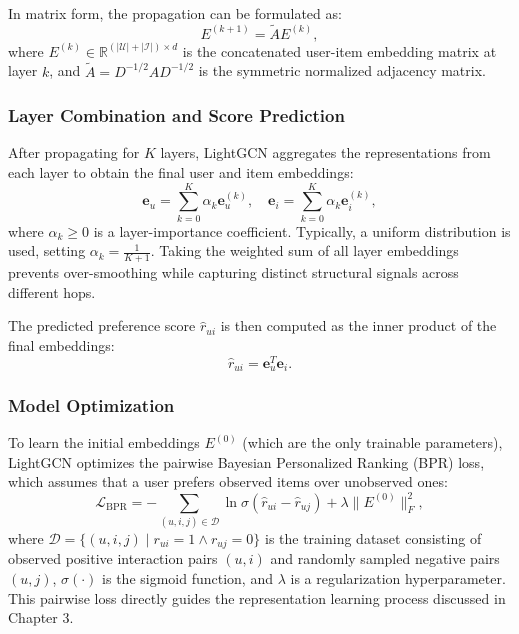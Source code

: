 In matrix form, the propagation can be formulated as:
\begin{equation}
    E^{(k+1)} = \tilde{A} E^{(k)},
    \label{eq:matrix_propagation}
\end{equation}
where \(E^{(k)} \in \mathbb{R}^{(|\mathcal{U}| + |\mathcal{I}|) \times d}\) is the concatenated user-item embedding matrix at layer \(k\), and \(\tilde{A} = D^{-1/2} A D^{-1/2}\) is the symmetric normalized adjacency matrix.

\subsubsection{Layer Combination and Score Prediction}

After propagating for \(K\) layers, LightGCN aggregates the representations from each layer to obtain the final user and item embeddings:
\begin{equation}
    \mathbf{e}_u = \sum_{k=0}^{K} \alpha_k \mathbf{e}_u^{(k)}, \quad \mathbf{e}_i = \sum_{k=0}^{K} \alpha_k \mathbf{e}_i^{(k)},
    \label{eq:layer_comb}
\end{equation}
where \(\alpha_k \ge 0\) is a layer-importance coefficient. Typically, a uniform distribution is used, setting \(\alpha_k = \frac{1}{K + 1}\). Taking the weighted sum of all layer embeddings prevents over-smoothing while capturing distinct structural signals across different hops.

The predicted preference score \(\hat{r}_{ui}\) is then computed as the inner product of the final embeddings:
\begin{equation}
    \hat{r}_{ui} = \mathbf{e}_u^{T} \mathbf{e}_i.
    \label{eq:score_prediction}
\end{equation}

\subsubsection{Model Optimization}

To learn the initial embeddings \(E^{(0)}\) (which are the only trainable parameters), LightGCN optimizes the pairwise Bayesian Personalized Ranking (BPR) loss, which assumes that a user prefers observed items over unobserved ones:
\begin{equation}
    \mathcal{L}_{\text{BPR}} = -\sum_{(u, i, j) \in \mathcal{D}} \ln \sigma(\hat{r}_{ui} - \hat{r}_{uj}) + \lambda \|E^{(0)}\|^2_F,
    \label{eq:bpr_loss}
\end{equation}
where \(\mathcal{D} = \{(u, i, j) \mid r_{ui} = 1 \land r_{uj} = 0\}\) is the training dataset consisting of observed positive interaction pairs \((u, i)\) and randomly sampled negative pairs \((u, j)\), \(\sigma(\cdot)\) is the sigmoid function, and \(\lambda\) is a regularization hyperparameter. This pairwise loss directly guides the representation learning process discussed in Chapter 3.

